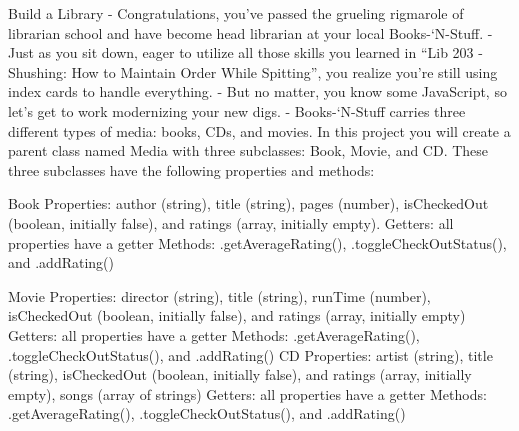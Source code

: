 Build a Library
    - Congratulations, you’ve passed the grueling rigmarole of librarian school and have become head librarian at your local Books-‘N-Stuff.
    - Just as you sit down, eager to utilize all those skills you learned in “Lib 203 - Shushing: How to Maintain Order While Spitting”, you realize you’re still using index cards to handle everything.
    - But no matter, you know some JavaScript, so let’s get to work modernizing your new digs.
    - Books-‘N-Stuff carries three different types of media: books, CDs, and movies. In this project you will create a parent class named Media with three subclasses: Book, Movie, and CD. These three subclasses have the following properties and methods:

Book
    Properties: author (string), title (string), pages (number), isCheckedOut (boolean, initially false), and ratings (array, initially empty).
    Getters: all properties have a getter
    Methods: .getAverageRating(), .toggleCheckOutStatus(), and .addRating()

Movie
    Properties: director (string), title (string), runTime (number), isCheckedOut (boolean, initially false), and ratings (array, initially empty)
    Getters: all properties have a getter
    Methods: .getAverageRating(), .toggleCheckOutStatus(), and .addRating()
CD
    Properties: artist (string), title (string), isCheckedOut (boolean, initially false), and ratings (array, initially empty), songs (array of strings)
    Getters: all properties have a getter
    Methods: .getAverageRating(), .toggleCheckOutStatus(), and .addRating()